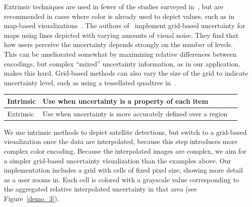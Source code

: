 
Extrinsic techniques are used in fewer of the studies surveyed in~\cite{Kinkeldey2014b}, but are recommended in cases where color is already used to depict values, such as in map-based visualizations~\cite{Kinkeldey2014a}. The authors of~\cite{Kinkeldey2014a} implement grid-based uncertainty for maps using lines depicted with varying amounts of visual noise. They find that how users perceive the uncertainty depends strongly on the number of levels. This can be ameliorated somewhat by maximizing relative differences between encodings, but complex ``mixed'' uncertainty information, as in our application, makes this hard. Grid-based methods can also vary the size of the grid to indicate uncertainty level, such as using a tessellated quadtree in~\cite{Kardos2007}.

\begin{center}
    \begin{tabu} {p{2cm}|p{8cm}X[l]}
        Intrinsic & Use when uncertainty is a property of each item \\
        \midrule
        Extrinsic & Use when uncertainty is more accurately defined over a region  \\
    \end{tabu}
\end{center}

We use intrinsic methods to depict satellite detections, but switch to a grid-based visualization once the data are interpolated, because this step introduces more complex color encoding. Because the interpolated images are complex, we aim for a simpler grid-based uncertainty visualization than the examples above. Our implementation includes a grid with cells of fixed pixel size, showing more detail as a user zooms in. Each cell is colored with a grayscale value corresponding to the aggregated relative interpolated uncertainty in that area (see Figure~\ref{demo_3}).



